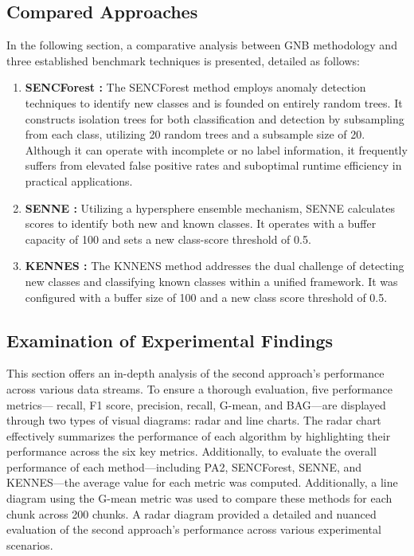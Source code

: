\subsection{Compared Approaches}
\label{sec:compared_approaches}
In the following section, a comparative analysis between GNB methodology and three established benchmark techniques is presented, detailed as follows:
\begin{enumerate}
	\item \textbf{SENCForest \cite{mu2017classification}:} The SENCForest method employs anomaly detection techniques to identify new classes and is founded on entirely random trees. It constructs isolation trees for both classification and detection by subsampling from each class, utilizing 20 random trees and a subsample size of 20. Although it can operate with incomplete or no label information, it frequently suffers from elevated false positive rates and suboptimal runtime efficiency in practical applications.
	\item \textbf{SENNE \cite{zhu2020semi}:} Utilizing a hypersphere ensemble mechanism, SENNE calculates scores to identify both new and known classes. It operates with a buffer capacity of 100 and sets a new class-score threshold of 0.5.
	\item \textbf{KENNES \cite{zhang2022knnens}:} The KNNENS method addresses the dual challenge of detecting new classes and classifying known classes within a unified framework. It was configured with a buffer size of 100 and a new class score threshold of 0.5.
\end{enumerate}



\subsection{Examination of Experimental Findings}
\label{sec:finding}
This section offers an in-depth analysis of the second approach's performance across various data streams. To ensure a thorough evaluation, five performance metrics— recall, F1 score, precision, recall, G-mean, and BAG—are displayed through two types of visual diagrams: radar and line charts. The radar chart effectively summarizes the performance of each algorithm by highlighting their performance across the six key metrics. Additionally, to evaluate the overall performance of each method—including PA2, SENCForest, SENNE, and KENNES—the average value for each metric was computed. Additionally, a line diagram using the G-mean metric was used to compare these methods for each chunk across 200 chunks. A radar diagram provided a detailed and nuanced evaluation of the second approach’s performance across various experimental scenarios.

